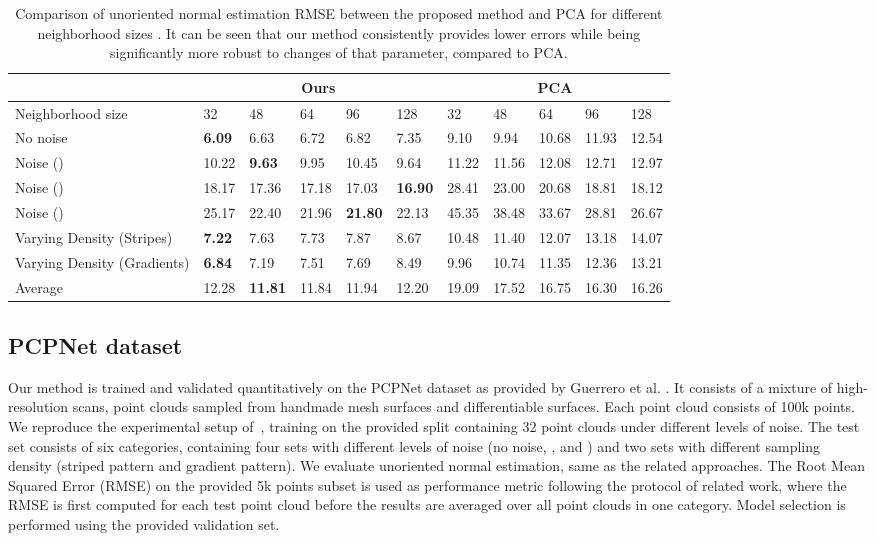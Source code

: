 \documentclass[10pt,twocolumn,letterpaper]{article}
\begin{document}
\begin{table*}[h]
\small
\centering
\begin{tabular}{llllll|lllll}
\toprule
& \multicolumn{5}{c}{Ours } & \multicolumn{5}{c}{PCA} \\
\midrule
 Neighborhood size  & 32  &  48  & 64 & 96 & 128 & 32  &  48  & 64 & 96 & 128  \\ 
\midrule
No noise  & \textbf{6.09}  & 6.63  & 6.72 & 6.82 & 7.35 & 9.10  &  9.94 & 10.68 & 11.93 & 12.54  \\ 
Noise ()  & 10.22 & \textbf{9.63} & 9.95 & 10.45 & 9.64 & 11.22 & 11.56  & 12.08 & 12.71  & 12.97\\ 
Noise ()  & 18.17 & 17.36 & 17.18 & 17.03 & \textbf{16.90} & 28.41 & 23.00 & 20.68 & 18.81 & 18.12 \\ 
Noise ()  & 25.17 & 22.40 & 21.96 & \textbf{21.80} & 22.13 & 45.35 & 38.48 & 33.67 & 28.81 & 26.67 \\ 
Varying Density (Stripes)   & \textbf{7.22}  & 7.63  & 7.73  & 7.87  & 8.67 & 10.48  & 11.40  & 12.07  & 13.18  & 14.07\\
Varying Density (Gradients)   & \textbf{6.84} & 7.19 & 7.51 & 7.69 & 8.49 & 9.96 & 10.74 & 11.35 & 12.36 & 13.21\\ 
\midrule
Average    & 12.28 &  \textbf{11.81} & 11.84 & 11.94 & 12.20 & 19.09 & 17.52 & 16.75 & 16.30 & 16.26 \\ 
\bottomrule
\end{tabular}
\caption{Comparison of unoriented normal estimation RMSE between the proposed method and PCA for different neighborhood sizes . It can be seen that our method consistently provides lower errors while being significantly more robust to changes of that parameter, compared to PCA.}
\label{tab:normal_result_comp}
\vspace{-0.3cm}
\end{table*}

\subsection{PCPNet dataset}
\label{sec:dataset}
Our method is trained and validated quantitatively on the PCPNet dataset as
provided by Guerrero et al. \cite{Guerrero:2018}. 
It consists of a mixture of high-resolution scans, point clouds sampled
from handmade mesh surfaces and differentiable surfaces. 
Each point cloud consists of 100k points. 
We reproduce the experimental setup of~\cite{Ben-Shabat:2018, Guerrero:2018}, 
training on the provided split containing 32 point clouds under different
levels of noise. 
The test set consists of six categories, containing four sets with 
different levels of noise (no noise, ,  
and ) and two sets with different sampling density 
(striped pattern and gradient pattern). We evaluate  unoriented normal estimation, same as the related approaches.
The Root Mean Squared Error (RMSE) on the provided 5k points subset is 
used as performance metric following the protocol of related work, where the
RMSE is first computed for each test point cloud before the results are
averaged over all point clouds in one category.  
Model selection is performed using the provided validation set. 
\end{document}
